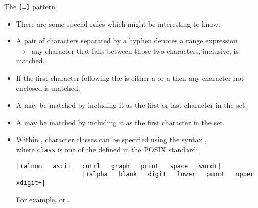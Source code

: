 \begin{frame}[fragile]{The \texttt{[\ldots]} pattern}
    \vspace{-1mm}
    \begin{itemize}
        \item There are some special rules which might be interesting to know.
        \item A pair of characters separated by a hyphen denotes a range expression\\
              $\to\;$ any character that falls between those two characters, inclusive, is matched.
        \item If the first character following the \PB{\texttt{[}} is either a \PP{\texttt{!}} or a \PP{\texttt{\^{}}} then any character not enclosed is matched.
        \item A \PP{\texttt{-}} may be matched by including it as the first or last character in the set.
        \item A \PP{\texttt{]}} may be matched by including it as the first character in the set.
        \item Within \PB{\texttt{[\ldots]}}, character classes can be specified using the syntax \PB{\texttt{[:class:]}},\\
              where \texttt{class} is one of the  defined in the POSIX standard:
              \begin{lstlisting}[style=MyBash, numbers=none, xleftmargin=2mm, xrightmargin=15mm, aboveskip=3mm, belowskip=-5mm]
                  |+alnum   ascii   cntrl   graph   print   space   word+|
                  |+alpha   blank   digit   lower   punct   upper   xdigit+|
              \end{lstlisting}
              For example, \PB{\texttt{[[:digit:]]}} or \PB{\texttt{[[:blank:]]}}.
    \end{itemize}
\end{frame}
